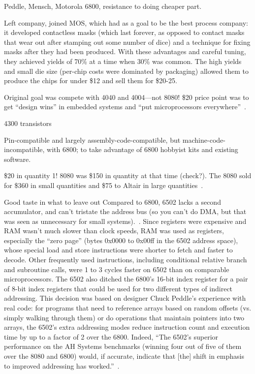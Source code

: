 \documentclass{article}
\begin{document}
Peddle, Mensch, Motorola 6800, resistance to doing cheaper part.

Left company, joined MOS, which had as a goal to be the best process
company: it developed contactless masks (which last forever, as opposed
to contact masks that wear out after stamping out some number of dice)
and a technique for fixing masks after they had been produced.  With
these advantages and careful tuning, they achieved yields of 70\% at a
time when 30\% was common.  The high yields and small die size
(per-chip costs were dominated by packaging) allowed them to produce the
chips for under \$12 and sell them for \$20-25.

Original goal was compete with 4040 and 4004---not 8080!  \$20 price
point was to get ``design wins'' in embedded systems and ``put
microprocessors everywhere''~\cite{commodore}.

4300 transistors

Pin-compatible and largely assembly-code-compatible, but
machine-code-incompatible, with 6800; to take advantage of 
6800 hobbyist kits and existing software.

\$20 in quantity 1!  8080 was \$150 in quantity at that time (check?).
The 8080 sold for \$360 in small quantities and \$75 to Altair 
in large quantities~\cite[p. 228]{ceruzzi}.

    \begin{geeknote}{Good taste in what to leave out}
Compared to 6800, 6502 lacks a second accumulator, and can't
tristate the address bus (so you can't do DMA, but that was seen as
unnecessary for small systems).~\cite{byte75:6502}.
Since registers were expensive and RAM wasn't much slower than
clock speeds, RAM was used as registers, especially the ``zero
page'' (bytes 0x0000 to 0x00ff in the 6502 address space), whose
special load and store instructions were shorter to fetch and
faster to decode.
Other frequently used instructions, including conditional relative
branch and subroutine calls, were 1 to 3 cycles faster on 6502 than
on comparable microprocessors.
The 6502 also ditched the 6800's 16-bit index register for a pair
of 8-bit index registers that could be used for two different types
of indirect addressing.
This decision was based on designer Chuck Peddle's experience with real
code: for programs that need to reference arrays based on random
offsets (vs. simply walking through them) or do operations that
maintain pointers into two arrays, the 6502's extra addressing modes
reduce instruction count and execution time by up to a
factor of 2 over the 6800.
Indeed, ``The 6502's superior performance on the AH Systems benchmarks
(winning four out of five of them over the 8080 and 6800) would, if
accurate, indicate that [the] shift in emphasis to improved addressing
has worked.''~\cite{edn75:6502}.
    \end{geeknote}
\end{document}

